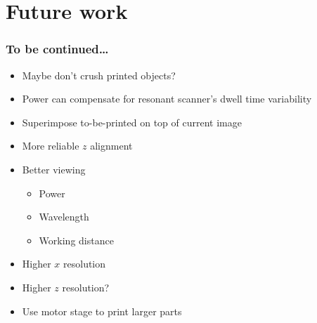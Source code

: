 \documentclass{beamer}
\begin{document}
\section{Future work}

\begin{frame}
  \frametitle{To be continued\dots}
  \begin{itemize}
  \item Maybe don't crush printed objects?
  \item Power can compensate for resonant scanner's dwell time variability
  \item Superimpose to-be-printed on top of current image
  \item More reliable $z$ alignment
  \item Better viewing
    \begin{itemize}
    \item Power
    \item Wavelength
    \item Working distance
    \end{itemize}
  \item Higher $x$ resolution
  \item Higher $z$ resolution?
  \item Use motor stage to print larger parts
  \end{itemize}
\end{frame}
  
\end{document}
